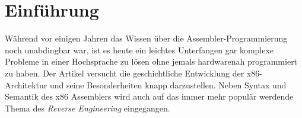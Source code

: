 \section{Einführung}
Während vor einigen Jahren das Wissen über die Assembler-Programmierung noch unabdingbar war, ist es heute ein leichtes Unterfangen gar komplexe Probleme in einer Hochsprache zu lösen ohne jemals hardwarenah programmiert zu haben.
Der Artikel versucht die geschichtliche Entwicklung der x86-Architektur und seine Besonderheiten knapp darzustellen.
Neben Syntax und Semantik des x86 Assemblers wird auch auf das immer mehr populär werdende Thema des \textit{Reverse Engineering} eingegangen.
